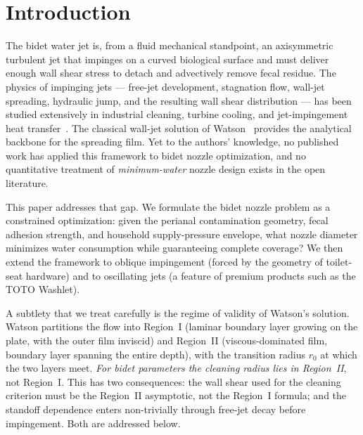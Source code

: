 \documentclass[10pt,letterpaper]{article}
\begin{document}
\maketitle

\section{Introduction}
\label{sec:intro}

The bidet water jet is, from a fluid mechanical standpoint, an axisymmetric
turbulent jet that impinges on a curved biological surface and must
deliver enough wall shear stress to detach and advectively remove fecal
residue. The physics of impinging jets --- free-jet development, stagnation
flow, wall-jet spreading, hydraulic jump, and the resulting wall shear
distribution --- has been studied extensively in industrial cleaning,
turbine cooling, and jet-impingement heat transfer~\citep{ZuckermanLior2006}.
The classical wall-jet solution of Watson~\citep{Watson1964} provides the
analytical backbone for the spreading film. Yet to the authors' knowledge,
no published work has applied this framework to bidet nozzle optimization,
and no quantitative treatment of \emph{minimum-water} nozzle design exists
in the open literature.

This paper addresses that gap. We formulate the bidet nozzle problem as a
constrained optimization: given the perianal contamination geometry, fecal
adhesion strength, and household supply-pressure envelope, what nozzle
diameter minimizes water consumption while guaranteeing complete coverage?
We then extend the framework to oblique impingement (forced by the
geometry of toilet-seat hardware) and to oscillating jets (a feature of
premium products such as the TOTO Washlet).

A subtlety that we treat carefully is the regime of validity of Watson's
solution. Watson partitions the flow into Region~I (laminar boundary
layer growing on the plate, with the outer film inviscid) and Region~II
(viscous-dominated film, boundary layer spanning the entire depth), with
the transition radius $r_0$ at which the two layers meet. \emph{For
bidet parameters the cleaning radius lies in Region~II}, not Region~I.
This has two consequences: the wall shear used for the cleaning criterion
must be the Region~II asymptotic, not the Region~I formula; and the
standoff dependence enters non-trivially through free-jet decay before
impingement. Both are addressed below.
\end{document}
